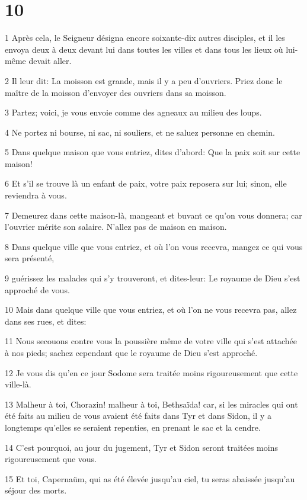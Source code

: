 \chapter{10}

\par 1 Après cela, le Seigneur désigna encore soixante-dix autres disciples, et il les envoya deux à deux devant lui dans toutes les villes et dans tous les lieux où lui-même devait aller.
\par 2 Il leur dit: La moisson est grande, mais il y a peu d'ouvriers. Priez donc le maître de la moisson d'envoyer des ouvriers dans sa moisson.
\par 3 Partez; voici, je vous envoie comme des agneaux au milieu des loups.
\par 4 Ne portez ni bourse, ni sac, ni souliers, et ne saluez personne en chemin.
\par 5 Dans quelque maison que vous entriez, dites d'abord: Que la paix soit sur cette maison!
\par 6 Et s'il se trouve là un enfant de paix, votre paix reposera sur lui; sinon, elle reviendra à vous.
\par 7 Demeurez dans cette maison-là, mangeant et buvant ce qu'on vous donnera; car l'ouvrier mérite son salaire. N'allez pas de maison en maison.
\par 8 Dans quelque ville que vous entriez, et où l'on vous recevra, mangez ce qui vous sera présenté,
\par 9 guérissez les malades qui s'y trouveront, et dites-leur: Le royaume de Dieu s'est approché de vous.
\par 10 Mais dans quelque ville que vous entriez, et où l'on ne vous recevra pas, allez dans ses rues, et dites:
\par 11 Nous secouons contre vous la poussière même de votre ville qui s'est attachée à nos pieds; sachez cependant que le royaume de Dieu s'est approché.
\par 12 Je vous dis qu'en ce jour Sodome sera traitée moins rigoureusement que cette ville-là.
\par 13 Malheur à toi, Chorazin! malheur à toi, Bethsaïda! car, si les miracles qui ont été faits au milieu de vous avaient été faits dans Tyr et dans Sidon, il y a longtemps qu'elles se seraient repenties, en prenant le sac et la cendre.
\par 14 C'est pourquoi, au jour du jugement, Tyr et Sidon seront traitées moins rigoureusement que vous.
\par 15 Et toi, Capernaüm, qui as été élevée jusqu'au ciel, tu seras abaissée jusqu'au séjour des morts.
